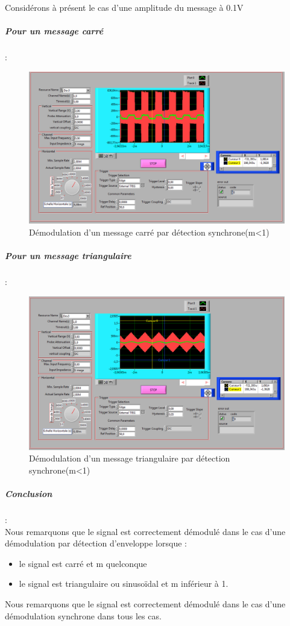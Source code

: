 \documentclass[french]{article}
\begin{document}
Considérons à présent le cas d'une amplitude du message à 0.1V
\newpage
\subparagraph{Pour un message carré} : \\
\begin{figure}[!h]
\includegraphics[width=\textwidth]{carre_synchrone_01.png}
\caption{Démodulation d'un message carré par détection synchrone(m<1)}
\end{figure}
\newpage
\subparagraph{Pour un message triangulaire} : \\
\begin{figure}[!h]
\includegraphics[width=\textwidth]{triangle_synchrone_01.png}
\caption{Démodulation d'un message triangulaire par détection synchrone(m<1)}
\end{figure}
\subparagraph{Conclusion} : \\
Nous remarquons que le signal est correctement démodulé dans le cas d'une démodulation par détection d'enveloppe lorsque : 
\begin{itemize}
\item le signal est carré et m quelconque
\item le signal est triangulaire ou sinusoïdal et m inférieur à 1.
\end{itemize}
Nous remarquons que le signal est correctement démodulé dans le cas d'une démodulation synchrone dans tous les cas. 
\end{document}
